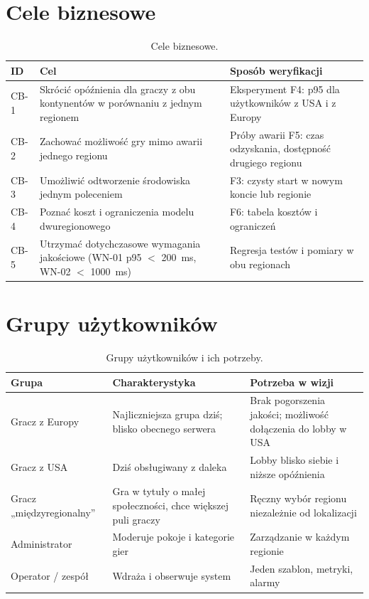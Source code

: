 \section{Cele biznesowe}
\begin{table}[H]
\centering\small
\begin{tabularx}{\textwidth}{@{}lYY@{}}
\toprule
\textbf{ID} & \textbf{Cel} & \textbf{Sposób weryfikacji} \\
\midrule
CB-1 & Skrócić opóźnienia dla graczy z obu kontynentów w porównaniu z jednym regionem & Eksperyment F4: p95 dla użytkowników z USA i z Europy \\
CB-2 & Zachować możliwość gry mimo awarii jednego regionu & Próby awarii F5: czas odzyskania, dostępność drugiego regionu \\
CB-3 & Umożliwić odtworzenie środowiska jednym poleceniem & F3: czysty start w nowym koncie lub regionie \\
CB-4 & Poznać koszt i ograniczenia modelu dwuregionowego & F6: tabela kosztów i ograniczeń \\
CB-5 & Utrzymać dotychczasowe wymagania jakościowe (WN-01 p95 $<$ 200~ms, WN-02 $<$ 1000~ms) & Regresja testów i pomiary w obu regionach \\
\bottomrule
\end{tabularx}
\caption{Cele biznesowe.}
\end{table}

\section{Grupy użytkowników}
\begin{table}[H]
\centering\small
\begin{tabularx}{\textwidth}{@{}lYY@{}}
\toprule
\textbf{Grupa} & \textbf{Charakterystyka} & \textbf{Potrzeba w wizji} \\
\midrule
Gracz z Europy & Najliczniejsza grupa dziś; blisko obecnego serwera & Brak pogorszenia jakości; możliwość dołączenia do lobby w USA \\
Gracz z USA & Dziś obsługiwany z daleka & Lobby blisko siebie i niższe opóźnienia \\
Gracz „międzyregionalny'' & Gra w tytuły o małej społeczności, chce większej puli graczy & Ręczny wybór regionu niezależnie od lokalizacji \\
Administrator & Moderuje pokoje i kategorie gier & Zarządzanie w każdym regionie \\
Operator / zespół & Wdraża i obserwuje system & Jeden szablon, metryki, alarmy \\
\bottomrule
\end{tabularx}
\caption{Grupy użytkowników i ich potrzeby.}
\end{table}

